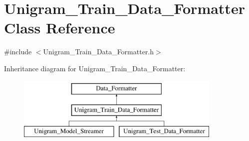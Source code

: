 \hypertarget{class_unigram___train___data___formatter}{
\section{Unigram\_\-Train\_\-Data\_\-Formatter Class Reference}
\label{class_unigram___train___data___formatter}
}


{\ttfamily \#include $<$Unigram\_\-Train\_\-Data\_\-Formatter.h$>$}

Inheritance diagram for Unigram\_\-Train\_\-Data\_\-Formatter:\begin{figure}[H]
\begin{center}
\leavevmode
\includegraphics[height=3cm]{class_unigram___train___data___formatter}
\end{center}
\end{figure}
